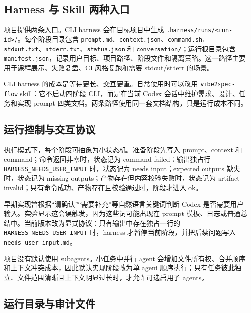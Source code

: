 \documentclass[11pt,a4paper]{article}
\newcommand{\code}[1]{\texttt{\small #1}}
\begin{document}
\subsection{Harness 与 Skill 两种入口}

项目提供两条入口。CLI harness 会在目标项目中生成 \code{.harness/runs/<run-id>/}。每个阶段目录包含 \code{prompt.md}、\code{context.json}、\code{command.sh}、\code{stdout.txt}、\code{stderr.txt}、\code{status.json} 和 \code{conversation/}；运行根目录包含 \code{manifest.json}，记录用户目标、项目路径、阶段文件和隔离策略。这一路径主要用于课程展示、失败复盘、CI 风格复跑和需要 stdout/stderr 的场景。

CLI harness 的成本是等待更长、交互更重。日常使用时可以改用 \code{vibe2spec-flow} skill：它不启动四阶段 CLI，而是在当前 Codex 会话中维护需求、设计、任务和实现 prompt 四类文档。两条路径使用同一套文档结构，只是运行成本不同。

\subsection{运行控制与交互协议}

执行模式下，每个阶段可抽象为小状态机。准备阶段先写入 prompt、context 和 command；命令返回非零时，状态记为 command failed；输出独占行 \code{HARNESS\_NEEDS\_USER\_INPUT} 时，状态记为 needs input；expected outputs 缺失时，状态记为 missing outputs；产物存在但内容校验失败时，状态记为 artifact invalid；只有命令成功、产物存在且校验通过时，阶段才进入 ok。

早期实现曾根据“请确认”“需要补充”等自然语言关键词判断 Codex 是否需要用户输入。实验显示这会误触发，因为这些词可能出现在 prompt 模板、日志或普通总结中。当前版本改为显式协议：只有输出中存在独占一行的 \code{HARNESS\_NEEDS\_USER\_INPUT} 时，harness 才暂停当前阶段，并把后续问题写入 \code{needs-user-input.md}。

项目没有默认使用 subagents。小任务中并行 agent 会增加文件所有权、合并顺序和上下文冲突成本，因此默认实现阶段改为单 agent 顺序执行；只有任务彼此独立、文件范围清晰且上下文明显过长时，才允许可选启用子 agents。

\subsection{运行目录与审计文件}
\end{document}
